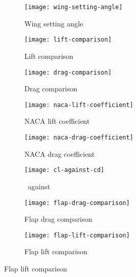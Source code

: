 \documentclass[../../main.tex]{subfiles}
\begin{document}
\begin{figure}[H]
    \centering
    \begin{subfigure}[b]{0.49\columnwidth}
        \centering
        \texttt{[image: wing-setting-angle]}
        \caption{Wing setting angle}
        \label{fig:wind-tunnel-results:wing-setting-angle}
    \end{subfigure}
    \hfill
    \begin{subfigure}[b]{0.49\columnwidth}
        \centering
        \texttt{[image: lift-comparison]}
        \caption{Lift comparison}
        \label{fig:wind-tunnel-results:lift-comparison}
    \end{subfigure}

    \begin{subfigure}[b]{0.49\columnwidth}
        \centering
        \texttt{[image: drag-comparison]}
        \caption{Drag comparison}
        \label{fig:wind-tunnel-results:drag-comparison}
    \end{subfigure}
    \hfill
    \begin{subfigure}[b]{0.49\columnwidth}
        \centering
        \texttt{[image: naca-lift-coefficient]}
        \caption{NACA lift coefficient}
        \label{fig:wind-tunnel-results:naca-lift-coefficient}
    \end{subfigure}

    \begin{subfigure}[b]{0.49\columnwidth}
        \centering
        \texttt{[image: naca-drag-coefficient]}
        \caption{NACA drag coefficient}
        \label{fig:wind-tunnel-results:naca-drag-coefficient}
    \end{subfigure}
    \hfill
    \begin{subfigure}[b]{0.49\columnwidth}
        \centering
        \texttt{[image: cl-against-cd]}
        \caption{\cl\, against \cd}
        \label{fig:wind-tunnel-results:cl-against-cd}
    \end{subfigure}

    \begin{subfigure}[b]{0.49\columnwidth}
        \centering
        \texttt{[image: flap-drag-comparison]}
        \caption{Flap drag comparison}
        \label{fig:wind-tunnel-results:flap-drag-comparison}
    \end{subfigure}
    \hfill
    \begin{subfigure}[b]{0.49\columnwidth}
        \centering
        \texttt{[image: flap-lift-comparison]}
        \caption{Flap lift comparison}
        \label{fig:wind-tunnel-results:flap-lift-comparison}
    \end{subfigure}


\end{figure}
\end{document}
